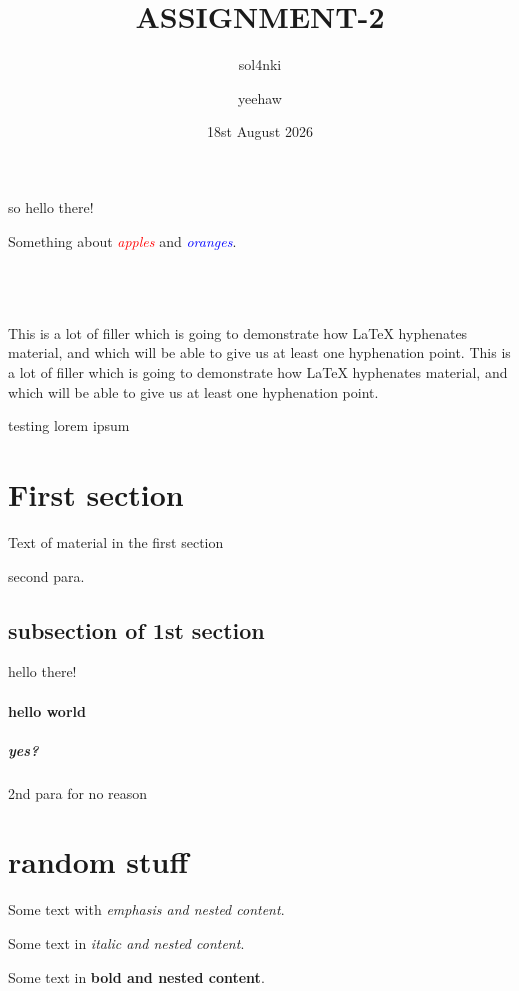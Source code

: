 \documentclass[twocolumn]{article}
\newcommand\cred[1]{\textcolor{red}{\itshape #1}}
\newcommand\cblu[1]{\textcolor{blue}{\itshape #1}}
\begin{document}
\author{sol4nki \and yeehaw}
\title{ASSIGNMENT-2}
\date{18st August 2026}
\maketitle
so hello there!

Something about \cred{apples} and \cblu{oranges}.

\tableofcontents


\lipsum
\lipsum
\lipsum
\\
\\
\\
This is a lot of filler which is going to demonstrate how LaTeX hyphenates
material, and which will be able to give us at least one hyphenation point.
This is a lot of filler which is going to demonstrate how LaTeX hyphenates
material, and which will be able to give us at least one hyphenation point.


testing lorem ipsum
\section{First section}
Text of material in the first section

second para.

\subsection{subsection of 1st section}
hello there!
\paragraph{hello world}
\subparagraph{yes?}
2nd para for no reason

\section{random stuff} 

Some text with \emph{emphasis and \emph{nested} content}.

Some text in \textit{italic and \textit{nested} content}.

Some text in \textbf{bold and \textbf{nested} content}.
\end{document}
